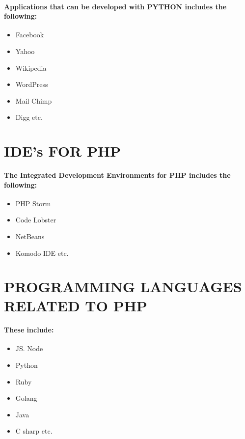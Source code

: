 \documentclass{article}
\begin{document}
\paragraph{Applications that can be developed with PYTHON includes the following:
}
\begin{itemize}
	\item Facebook
	\item Yahoo
	\item Wikipedia
	\item WordPress
	\item Mail Chimp
	\item Digg etc.
\end{itemize}
\newpage
\section*{IDE’s FOR PHP}
\paragraph{The Integrated Development Environments for PHP includes the following:}
\begin{itemize}
	\item PHP Storm
	\item Code Lobster
	\item NetBeans
	\item Komodo IDE etc.
\end{itemize}
\newpage
\section*{PROGRAMMING LANGUAGES RELATED TO PHP}
\paragraph{These include:
}
\begin{itemize}
	\item JS. Node
	\item Python
	\item Ruby
	\item Golang
	\item Java
	\item C sharp etc.
\end{itemize}
\newpage
\pagecolor{white}
\color{black}
\end{document}

